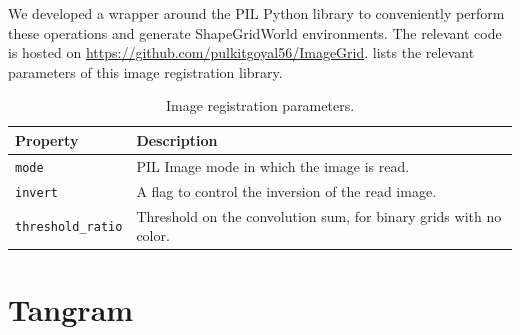 We developed a wrapper around the PIL Python library \citep{pil} to conveniently perform these operations and generate ShapeGridWorld environments.
The relevant code is hosted on \url{https://github.com/pulkitgoyal56/ImageGrid}.
 lists the relevant parameters of this image registration library.
\begin{table}[H]
    \centering
    \begin{tabularx}{\textwidth}{C{3.9cm} L}
        \hline
        Property & Description\\
        \hline
        \texttt{mode} & PIL Image mode in which the image is read.\\
        \texttt{invert} & A flag to control the inversion of the read image. \\
        \texttt{threshold\_ratio} & Threshold on the convolution sum, for binary grids with no color.\\
        \hline
    \end{tabularx}
    \caption{Image registration parameters.}
    \label{tab:imagelib-params}
\end{table}


\newpage
\section{Tangram}
\label{sec:tangram-details}

